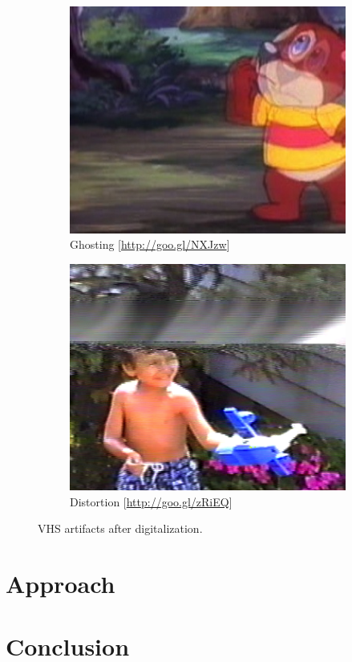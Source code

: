 \documentclass[runningheads,a4paper]{llncs}
\begin{document}
\begin{figure}
  \centering
  \begin{subfigure}[b]{0.45\linewidth}
    \centering
    \includegraphics[width=\textwidth]{ghosting.png} 
    \caption{Ghosting
    [\url{http://goo.gl/NXJzw}]}
     \label{fig:ghosting}
  \end{subfigure}
  \begin{subfigure}[b]{0.45\linewidth}
    \centering
    \includegraphics[width=\textwidth]{distortion.png} 
    \caption{Distortion
    [\url{http://goo.gl/zRiEQ}]}
     \label{fig:distortion}
  \end{subfigure}  
  \label{fig:artifacts}
  \caption{VHS artifacts after digitalization.}
\end{figure}

\section{Approach}
\cite{steiner2011crowdsourcing}
\cite{yang2009videonoise}
\section{Conclusion}



\end{document}
